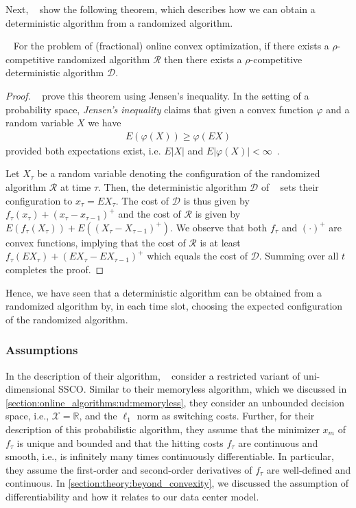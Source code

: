 Next, \citeauthor*{Bansal2015}~\cite{Bansal2015} show the following theorem, which describes how we can obtain a deterministic algorithm from a randomized algorithm. \begin{theorem}
   ~\cite{Bansal2015} For the problem of (fractional) online convex optimization, if there exists a $\rho$-competitive randomized algorithm $\mathcal{R}$ then there exists a $\rho$-competitive deterministic algorithm $\mathcal{D}$.
\end{theorem}
\begin{proof}
\citeauthor*{Bansal2015}~\cite{Bansal2015} prove this theorem using Jensen's inequality. In the setting of a probability space, \emph{Jensen's inequality} claims that given a convex function $\varphi$ and a random variable $X$ we have \begin{align}
    E(\varphi(X)) \geq \varphi(E X)
\end{align} provided both expectations exist, i.e. $E |X|$ and $E |\varphi(X)| < \infty$~\cite{Durrett2010}.

Let $X_{\tau}$ be a random variable denoting the configuration of the randomized algorithm $\mathcal{R}$ at time $\tau$. Then, the deterministic algorithm $\mathcal{D}$ of \citeauthor*{Bansal2015}~\cite{Bansal2015} sets their configuration to $x_{\tau} = E X_{\tau}$. The cost of $\mathcal{D}$ is thus given by $f_{\tau}(x_{\tau}) + (x_{\tau} - x_{\tau-1})^+$ and the cost of $\mathcal{R}$ is given by $E(f_{\tau}(X_{\tau})) + E((X_{\tau} - X_{\tau-1})^+)$. We observe that both $f_{\tau}$ and $(\cdot)^+$ are convex functions, implying that the cost of $\mathcal{R}$ is at least $f_{\tau}(E X_{\tau}) + (E X_{\tau} - E X_{\tau-1})^+$ which equals the cost of $\mathcal{D}$. Summing over all $t$ completes the proof.
\end{proof}

Hence, we have seen that a deterministic algorithm can be obtained from a randomized algorithm by, in each time slot, choosing the expected configuration of the randomized algorithm.

\subsubsection{Assumptions}

In the description of their algorithm, \citeauthor*{Bansal2015}~\cite{Bansal2015} consider a restricted variant of uni-dimensional SSCO. Similar to their memoryless algorithm, which we discussed in \cref{section:online_algorithms:ud:memoryless}, they consider an unbounded decision space, i.e., $\mathcal{X} = \mathbb{R}$, and the $\ell_1$ norm as switching costs. Further, for their description of this probabilistic algorithm, they assume that the minimizer $x_m$ of $f_{\tau}$ is unique and bounded and that the hitting costs $f_{\tau}$ are continuous and smooth, i.e., is infinitely many times continuously differentiable. In particular, they assume the first-order and second-order derivatives of $f_{\tau}$ are well-defined and continuous. In \cref{section:theory:beyond_convexity}, we discussed the assumption of differentiability and how it relates to our data center model.

